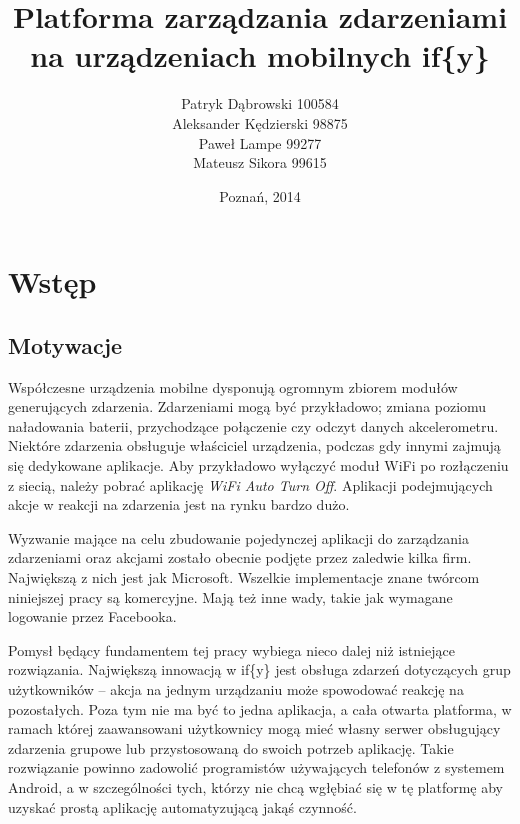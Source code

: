 \documentclass[11pt,a4paper,polish,thesis]{dcsbook}
\begin{document}
\author{Patryk Dąbrowski 100584\\ Aleksander Kędzierski 98875\\ Paweł Lampe 99277\\ Mateusz Sikora 99615}
\title{Platforma zarządzania zdarzeniami na urządzeniach mobilnych if\{y\}}
\date{Poznań, 2014}

\maketitle

\frontmatter

\tableofcontents{}

\mainmatter

\chapter{Wstęp}
\section{Motywacje}
Współczesne urządzenia mobilne dysponują ogromnym zbiorem modułów generujących zdarzenia. Zdarzeniami mogą być przykładowo; zmiana poziomu naładowania
baterii, przychodzące połączenie czy odczyt danych akcelerometru. Niektóre zdarzenia obsługuje właściciel urządzenia, podczas gdy innymi zajmują się dedykowane
aplikacje. Aby przykładowo wyłączyć moduł WiFi po rozłączeniu z siecią, należy pobrać aplikację \emph{WiFi Auto Turn Off}. Aplikacji podejmujących akcje w reakcji
na zdarzenia jest na rynku bardzo dużo.

Wyzwanie mające na celu zbudowanie pojedynczej aplikacji do zarządzania zdarzeniami oraz akcjami zostało obecnie podjęte przez zaledwie kilka firm. Największą z nich
jest jak Microsoft. Wszelkie implementacje znane twórcom niniejszej pracy są komercyjne. Mają też inne wady, takie jak wymagane logowanie przez Facebooka.

Pomysł będący fundamentem tej pracy wybiega nieco dalej niż istniejące rozwiązania. Największą innowacją w if\{y\} jest obsługa zdarzeń dotyczących grup użytkowników -- akcja na jednym urządzaniu może spowodować reakcję na pozostałych.
Poza tym nie ma być to jedna aplikacja, a cała otwarta platforma, w ramach której zaawansowani użytkownicy mogą mieć własny serwer obsługujący zdarzenia grupowe lub
przystosowaną do swoich potrzeb aplikację. Takie rozwiązanie powinno zadowolić programistów używających telefonów z systemem Android, a w szczególności tych, którzy nie chcą wgłębiać się w tę platformę aby uzyskać prostą aplikację automatyzującą jakąś czynność.
\end{document}
